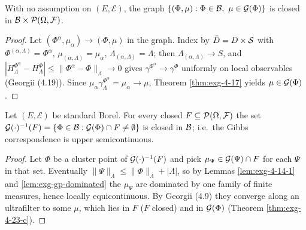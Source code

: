\begin{theorem}[Georgii (4.23)(c)]
    \label{thm:exg-4-23-c}
    \leanok

    With no assumption on $(E,\mathcal E)$, the graph
    $\{(\Phi,\mu):\Phi\in\Bspace,\ \mu\in\Gibbs{\Phi}\}$ is closed in
    $\mathcal{B}\times\mathcal{P}(\Omega,\mathcal F)$.
\end{theorem}
\begin{proof}
    \leanok

    Let $(\Phi^\alpha,\mu_\alpha)\to(\Phi,\mu)$ in the graph. Index by $\bar D = D\times\mathcal{S}$
    with $\Phi^{(\alpha,\Lambda)}=\Phi^\alpha$, $\mu_{(\alpha,\Lambda)}=\mu_\alpha$,
    $\Lambda_{(\alpha,\Lambda)}=\Lambda$; then $\Lambda_{(\alpha,\Lambda)}\to S$, and
    $|H^{\Phi^\alpha}_\Lambda-H^\Phi_\Lambda|\le\|\Phi^\alpha-\Phi\|_\Lambda\to0$ gives
    $\gamma^{\Phi^\alpha}\to\gamma^\Phi$ uniformly on local observables (Georgii (4.19)).
    Since $\mu_\alpha\gamma^{\Phi^\alpha}_\Lambda=\mu_\alpha\to\mu$,
    Theorem \ref{thm:exg-4-17} yields $\mu\in\mathcal{G}(\Phi)$.
\end{proof}

\begin{theorem}[Georgii (4.23)(d)]
    \label{thm:exg-4-23-d}
    \leanok

    Let $(E,\mathcal E)$ be standard Borel. For every closed
    $F\subseteq\mathcal{P}(\Omega,\mathcal F)$ the set
    $\mathcal{G}(\cdot)^{-1}(F)=\{\Phi\in\mathcal{B}:\mathcal{G}(\Phi)\cap F\neq\emptyset\}$ is closed in
    $\mathcal{B}$; i.e.\ the Gibbs correspondence is upper semicontinuous.
\end{theorem}
\begin{proof}
    \leanok

    Let $\Phi$ be a cluster point of $\mathcal{G}(\cdot)^{-1}(F)$ and pick
    $\mu_\Psi\in\mathcal{G}(\Psi)\cap F$ for each $\Psi$ in that set. Eventually
    $\|\Psi\|_\Lambda\le\|\Phi\|_\Lambda+|\Lambda|$, so by Lemmas \ref{lem:exg-4-14-1} and
    \ref{lem:exg-gp-dominated} the $\mu_\Psi$ are dominated by one family of finite measures,
    hence locally equicontinuous. By Georgii (4.9) they converge along an ultrafilter to some
    $\mu$, which lies in $F$ ($F$ closed) and in $\mathcal{G}(\Phi)$
    (Theorem \ref{thm:exg-4-23-c}).
\end{proof}

